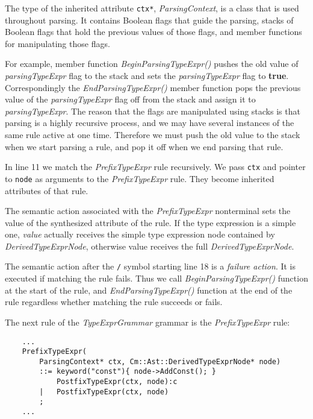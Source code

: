 \documentclass[a4paper,oneside,11pt]{book}
\theoremstyle{definition}
\begin{document}
The type of the inherited attribute \verb|ctx*|, \emph{ParsingContext}, is a class that is used throughout parsing.
It contains Boolean flags that guide the parsing, stacks of Boolean flags that hold the previous values of those flags,
and member functions for manipulating those flags.

For example, member function \emph{BeginParsingTypeExpr()} pushes the old value of \emph{parsingTypeExpr} flag to the
stack and sets the \emph{parsingTypeExpr} flag to \textbf{true}.
Correspondingly the \emph{EndParsingTypeExpr()} member function pops the previous value of the \emph{parsingTypeExpr} flag off from the
stack and assign it to \emph{parsingTypeExpr}.
The reason that the flags are manipulated using stacks is that parsing is a highly recursive process, and
we may have several instances of the same rule active at one time.
Therefore we must push the old value to the stack when we start parsing a rule, and pop it off when we end parsing that rule.

In line 11 we match the \emph{PrefixTypeExpr} rule recursively.
We pass \verb|ctx| and pointer to \verb|node| as arguments to the \emph{PrefixTypeExpr} rule.
They become inherited attributes of that rule.

The semantic action associated with the \emph{PrefixTypeExpr} nonterminal sets the value of the synthesized attribute of the rule.
If the type expression is a simple one, \emph{value} actually receives the simple type expression node contained by \emph{DerivedTypeExprNode},
otherwise value receives the full \emph{DerivedTypeExprNode}.

The semantic action after the \verb|/| symbol starting line 18 is a \emph{failure action}.
It is executed if matching the rule fails. Thus we call \emph{BeginParsingTypeExpr()} function at the start of the rule,
and \emph{EndParsingTypeExpr()} function at the end of the rule regardless whether matching the rule succeeds or fails.

\begin{flushleft}
The next rule of the \emph{TypeExprGrammar} grammar is the \emph{PrefixTypeExpr} rule:
\end{flushleft}

\lstset{language=cmpg}
\begin{lstlisting}
    ...
    PrefixTypeExpr(
        ParsingContext* ctx, Cm::Ast::DerivedTypeExprNode* node)
        ::= keyword("const"){ node->AddConst(); }
            PostfixTypeExpr(ctx, node):c
        |   PostfixTypeExpr(ctx, node)
        ;
    ...
\end{lstlisting}
\end{document}
